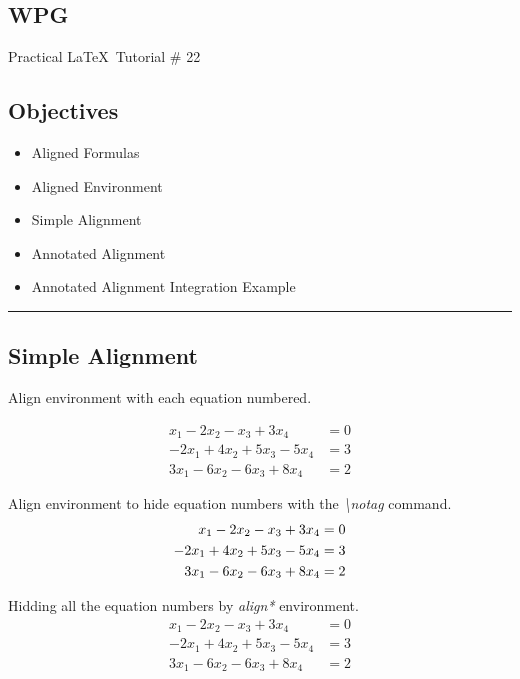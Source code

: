 \documentclass{article}
\begin{document}
	
	\begin{center}
		\section*{WPG}
		{\Large Practical \LaTeX\, Tutorial \# 22}
	\end{center}	
	\subsection*{Objectives}
	\begin{itemize}
		\item Aligned Formulas
		\item Aligned Environment
		\item Simple Alignment
		\item Annotated Alignment
		\item Annotated Alignment Integration Example
	\end{itemize}
	\hrule
	\bigskip
	
	
	\subsection*{Simple Alignment}
	
	\par Align environment with each equation numbered.
	
	
	\begin{align}
		x_1 - 2x_2 - x_3 + 3x_4 &= 0 \\
		-2x_1 + 4x_2 + 5x_3 - 5x_4 &= 3 \\
		3x_1 - 6x_2 -6x_3 + 8x_4 &= 2
	\end{align}
		
	\par Align environment to hide equation numbers with the \textit{\textbackslash notag} command.
	\begin{align}
		x_1 - 2x_2 - x_3 + 3x_4 &= 0 \\
		-2x_1 + 4x_2 + 5x_3 - 5x_4 &= 3 \notag\\
		3x_1 - 6x_2 -6x_3 + 8x_4 &= 2 \notag
	\end{align}
	
	\par Hidding all the equation numbers by \textit{align*} environment.
	\begin{align*}
		x_1 - 2x_2 - x_3 + 3x_4 &= 0 \\
		-2x_1 + 4x_2 + 5x_3 - 5x_4 &= 3 \\
		3x_1 - 6x_2 -6x_3 + 8x_4 &= 2 
	\end{align*}
	
\end{document}
